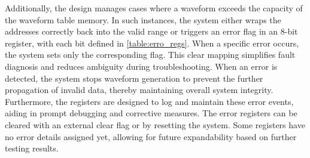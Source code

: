 Additionally, the design manages cases where a waveform exceeds the capacity of the waveform table memory. In such instances, the system either wraps the addresses correctly back into the valid range or triggers an error flag in an 8-bit register, with each bit defined in \autoref{table:erro_regs}. 
When a specific error occurs, the system sets only the corresponding flag. This clear mapping simplifies fault diagnosis and reduces ambiguity during troubleshooting. When an error is detected, the system stops waveform generation to prevent the further propagation of invalid data, thereby maintaining overall system integrity. Furthermore, the registers are designed to log and maintain these error events, aiding in prompt debugging and corrective measures. The error registers can be cleared with an external clear flag or by resetting the system. Some registers have no error details assigned yet, allowing for future expandability based on further testing results.

